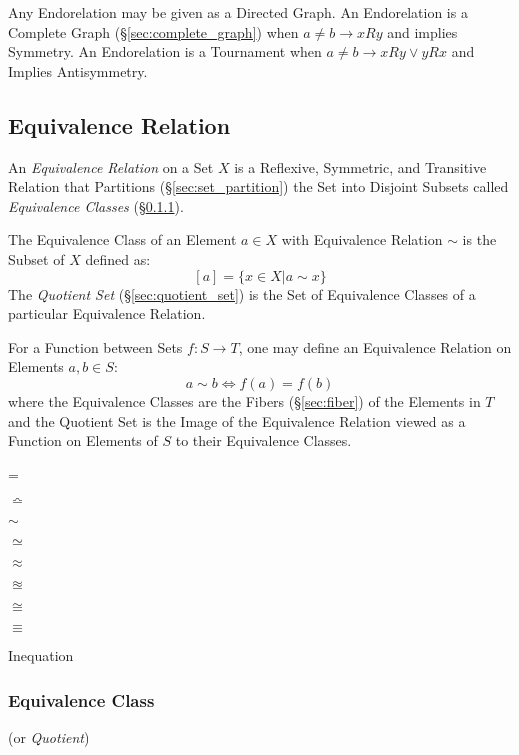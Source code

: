 Any Endorelation may be given as a Directed Graph. An Endorelation is
a Complete Graph (\S\ref{sec:complete_graph}) when $a \neq b
\rightarrow xRy$ and implies Symmetry. An Endorelation is a Tournament
when $a \neq b \rightarrow xRy \vee yRx$ and Implies Antisymmetry.



\subsection{Equivalence Relation}\label{sec:equivalence_relation}

An \emph{Equivalence Relation} on a Set $X$ is a Reflexive, Symmetric,
and Transitive Relation that Partitions (\S\ref{sec:set_partition})
the Set into Disjoint Subsets called \emph{Equivalence Classes}
(\S\ref{sec:equivalence_class}).

The Equivalence Class of an Element $a \in X$ with Equivalence
Relation $\sim$ is the Subset of $X$ defined as:
\[
    [a] = \{x \in X | a \sim x\}
\]
The \emph{Quotient Set} (\S\ref{sec:quotient_set}) is the Set of
Equivalence Classes of a particular Equivalence Relation.

For a Function between Sets $f : S \rightarrow T$, one may define an
Equivalence Relation on Elements $a,b \in S$:
\[
    a \sim b \Leftrightarrow f(a) = f(b)
\]
where the Equivalence Classes are the Fibers (\S\ref{sec:fiber}) of
the Elements in $T$ and the Quotient Set is the Image of the
Equivalence Relation viewed as a Function on Elements of $S$ to their
Equivalence Classes.

=

$\bumpeq$

$\sim$

$\simeq$

$\approx$

$\approxeq$

$\cong$

$\equiv$

Inequation



\subsubsection{Equivalence Class}\label{sec:equivalence_class}

(or \emph{Quotient})



